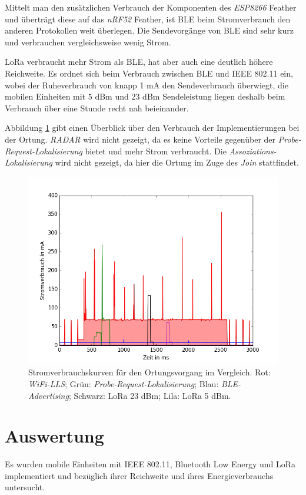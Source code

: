 Mittelt man den zusätzlichen Verbrauch der Komponenten des \emph{ESP8266} Feather und überträgt diese auf das \emph{nRF52} Feather, ist BLE beim Stromverbrauch den anderen Protokollen weit überlegen.
Die Sendevorgänge von BLE sind sehr kurz und verbrauchen vergleichsweise wenig Strom.

LoRa verbraucht mehr Strom als BLE, hat aber auch eine deutlich höhere Reichweite.
Es ordnet sich beim Verbrauch zwischen BLE und IEEE 802.11 ein, wobei der Ruheverbrauch von knapp 1 mA den Sendeverbrauch überwiegt, die mobilen Einheiten mit 5 dBm und 23 dBm Sendeleistung liegen deshalb beim Verbrauch über eine Stunde recht nah beieinander.

Abbildung \ref{fig:alle} gibt einen Überblick über den Verbrauch der Implementierungen bei der Ortung. 
\emph{RADAR} wird nicht gezeigt, da es keine Vorteile gegenüber der \emph{Probe-Request-Lokalisierung} bietet und mehr Strom verbraucht.
Die \emph{Assoziations-Lokalisierung} wird nicht gezeigt, da hier die Ortung im Zuge des \emph{Join} stattfindet.

\begin{figure}[h!]
  \centering
	\includegraphics[width=\textwidth]{plots/alle.png}
  \caption{Stromverbrauchskurven für den Ortungsvorgang im Vergleich. Rot: \emph{WiFi-LLS}; Grün: \emph{Probe-Request-Lokalisierung}; Blau: \emph{BLE-Advertising}; Schwarz: LoRa 23 dBm; Lila: LoRa 5 dBm.}
  \label{fig:alle}
\end{figure}


\section{Auswertung}
Es wurden mobile Einheiten mit IEEE 802.11, Bluetooth Low Energy und LoRa implementiert und bezüglich ihrer Reichweite und ihres Energieverbrauchs untersucht.

